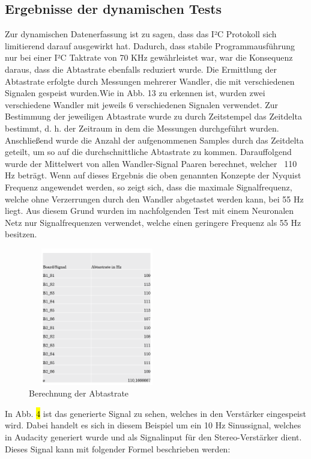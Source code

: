 \begin{flushleft}

\subsection{Ergebnisse der dynamischen Tests}
Zur dynamischen Datenerfassung ist zu sagen, dass das I²C Protokoll sich limitierend darauf ausgewirkt hat. Dadurch, dass stabile Programmausführung nur bei einer I²C Taktrate von 70 KHz gewährleistet war, war die Konsequenz daraus, dass die Abtastrate ebenfalls reduziert wurde. Die Ermittlung der Abtastrate erfolgte durch Messungen mehrerer Wandler, die mit verschiedenen Signalen gespeist wurden.Wie in Abb. 13 zu erkennen ist, wurden zwei verschiedene Wandler mit jeweils 6 verschiedenen Signalen verwendet. Zur Bestimmung der jeweiligen Abtastrate wurde zu durch Zeitstempel das Zeitdelta bestimmt, d. h. der Zeitraum in dem die Messungen durchgeführt wurden. Anschließend wurde die Anzahl der aufgenommenen Samples durch das Zeitdelta geteilt, um so auf die durchschnittliche Abtastrate zu kommen. Darauffolgend wurde der Mittelwert von allen Wandler-Signal Paaren berechnet, welcher ~110 Hz beträgt. Wenn auf dieses Ergebnis die oben genannten Konzepte der Nyquist Frequenz angewendet werden, so zeigt sich, dass die maximale Signalfrequenz, welche ohne Verzerrungen durch den Wandler abgetastet werden kann, bei 55 Hz liegt. Aus diesem Grund wurden im nachfolgenden Test mit einem Neuronalen Netz nur Signalfrequenzen verwendet, welche einen geringere Frequenz als 55 Hz besitzen. 

\begin{figure}[H]
    \centering
 \includegraphics[height= 6cm,width = 6cm]{Pictures/Speed.png}
    \caption{Berechnung der Abtastrate}
\end{figure}


In Abb. \hl{4} ist das generierte Signal zu sehen, welches in den Verstärker eingespeist wird. Dabei handelt es sich in diesem Beispiel um ein 10 Hz Sinussignal, welches in Audacity generiert wurde und als Signalinput für den Stereo-Verstärker dient. Dieses Signal kann mit folgender Formel beschrieben werden:


\end{flushleft}
